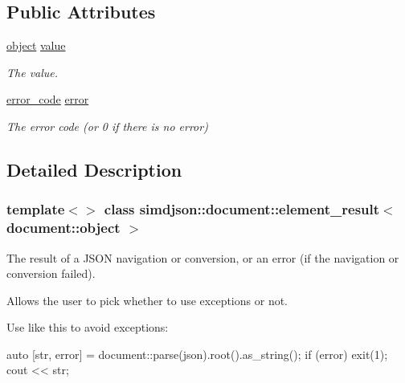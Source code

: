 \subsection*{Public Attributes}
\begin{DoxyCompactItemize}
\item 
\mbox{\label{classsimdjson_1_1document_1_1element__result_3_01document_1_1object_01_4_a65174f23d014d2e7d6ed87f42b60045a}} 
\hyperlink{classsimdjson_1_1document_1_1object}{object} \hyperlink{classsimdjson_1_1document_1_1element__result_3_01document_1_1object_01_4_a65174f23d014d2e7d6ed87f42b60045a}{value}
\begin{DoxyCompactList}\small\item\em The value. \end{DoxyCompactList}\item 
\mbox{\label{classsimdjson_1_1document_1_1element__result_3_01document_1_1object_01_4_afb94302f28fe94b4eee922f4803abf86}} 
\hyperlink{namespacesimdjson_a7b735a3a50ba79e3f7f14df5f77d8da9}{error\+\_\+code} \hyperlink{classsimdjson_1_1document_1_1element__result_3_01document_1_1object_01_4_afb94302f28fe94b4eee922f4803abf86}{error}
\begin{DoxyCompactList}\small\item\em The error code (or 0 if there is no error) \end{DoxyCompactList}\end{DoxyCompactItemize}


\subsection{Detailed Description}
\subsubsection*{template$<$$>$\newline
class simdjson\+::document\+::element\+\_\+result$<$ document\+::object $>$}

The result of a J\+S\+ON navigation or conversion, or an error (if the navigation or conversion failed). 

Allows the user to pick whether to use exceptions or not.

Use like this to avoid exceptions\+: \begin{DoxyVerb}auto [str, error] = document::parse(json).root().as_string();
if (error) { exit(1); }
cout << str;
\end{DoxyVerb}


